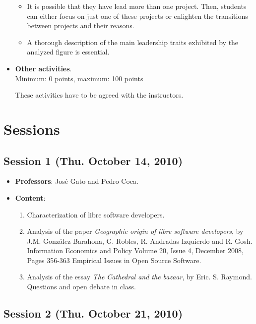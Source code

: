 \documentclass[a4paper]{article}
\begin{document}
\begin{itemize}
\begin{itemize}
   \item It is possible that they have lead more than one project. Then, students can either focus on just
   one of these projects or enlighten the transitions between projects and their reasons.
   \item A thorough description of the main leadership traits exhibited by the analyzed figure is essential.
  \end{itemize}


\item \textbf{Other activities}. \\
  Minimum: 0 points, maximum: 100 points

  These activities have to be agreed with the instructors.
\end{itemize}

\section{Sessions}

\subsection{Session 1 (Thu. October 14, 2010)}

\begin{itemize}
 \item \textbf{Professors}: José Gato and Pedro Coca.

 \item \textbf{Content}:

  \begin{enumerate}
   \item Characterization of libre software developers.
   \item Analysis of the paper \textit{Geographic origin of libre software developers}, by J.M. González-Barahona,
  G. Robles, R. Andradas-Izquierdo and R. Gosh. Information Economics and Policy Volume 20, Issue 4, December 2008, Pages 356-363
  Empirical Issues in Open Source Software.

    \item Analysis of the essay \textit{The Cathedral and the bazaar}, by Eric. S. Raymond. Questions and open debate in class.
  \end{enumerate}

\end{itemize}

\subsection{Session 2 (Thu. October 21, 2010)}
\end{document}
